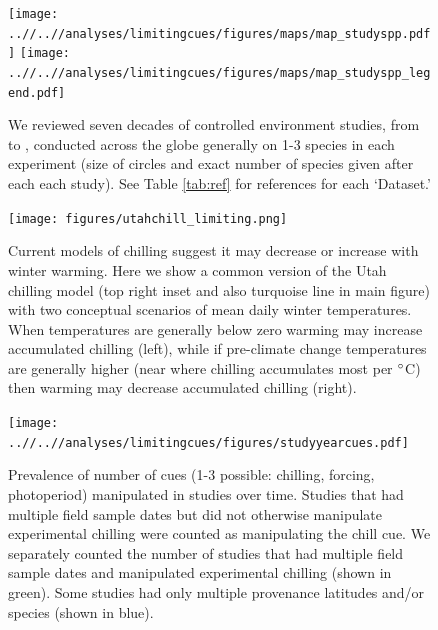 \documentclass[11pt]{article}
\begin{document}
\begin{figure}[t!]
\centering
\texttt{[image: ..//..//analyses/limitingcues/figures/maps/map\_studyspp.pdf]}
\texttt{[image: ..//..//analyses/limitingcues/figures/maps/map\_studyspp\_legend.pdf]}
\caption{We reviewed seven decades of controlled environment studies, from \citet{Lamb:1948aa} to \citet{zohner2016}, conducted across the globe generally on 1-3 species in each experiment (size of circles and exact number of species given after each each study). See Table \ref{tab:ref} for references for each `Dataset.'}
  \label{fig:datamap} %
\end{figure}


\begin{figure}[t!]
\centering
\texttt{[image: figures/utahchill\_limiting.png]}
\caption{Current models of chilling suggest it may decrease or increase with winter warming. Here we show a common version of the Utah chilling model (top right inset and also turquoise line in main figure) with two conceptual scenarios of mean daily winter temperatures. When temperatures are generally below zero warming may increase accumulated chilling (left), while if pre-climate change temperatures are generally higher (near where chilling accumulates most per $\degree$C) then warming may decrease accumulated chilling (right).}
  \label{fig:chilling}
\end{figure}

\clearpage

\begin{figure}[t!]
\centering
\texttt{[image: ..//..//analyses/limitingcues/figures/studyyearcues.pdf]}
\caption{Prevalence of number of cues (1-3 possible: chilling, forcing, photoperiod) manipulated in studies over time. Studies that had multiple field sample dates but did not otherwise manipulate experimental chilling were counted as manipulating the chill cue. We separately counted the number of studies that had multiple field sample dates and manipulated experimental chilling (shown in green). Some studies had only multiple provenance latitudes and/or species (shown in blue). }
  \label{fig:ts}
\end{figure}
\end{document}
